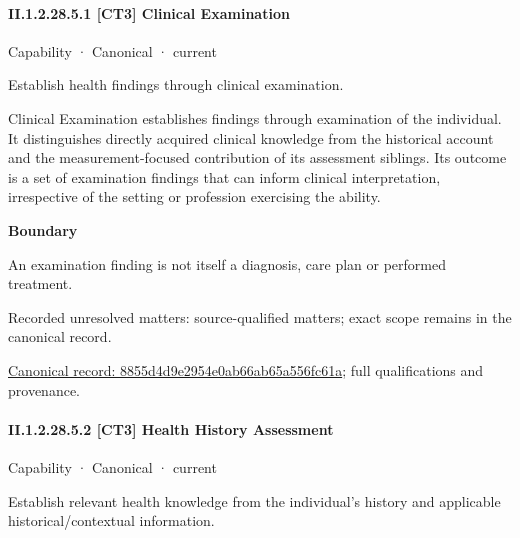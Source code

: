 \paragraph*{II.1.2.28.5.1 [CT3] Clinical Examination}
\label{navigation:II.1.2.28.5.1}

\label{element:8855d4d9e2954e0ab66ab65a556fc61a}
{\small Capability · Canonical · current}\par

Establish health findings through clinical examination.



Clinical Examination establishes findings through examination of the individual. It distinguishes directly acquired clinical knowledge from the historical account and the measurement-focused contribution of its assessment siblings. Its outcome is a set of examination findings that can inform clinical interpretation, irrespective of the setting or profession exercising the ability.



\textbf{Boundary}



An examination finding is not itself a diagnosis, care plan or performed treatment.


{\small Recorded unresolved matters: source-qualified matters; exact scope remains in the canonical record.}\par
{\footnotesize \href{../../../../continuum/strategy/capability/8855d4d9e2954e0ab66ab65a556fc61a.md}{Canonical record: 8855d4d9e2954e0ab66ab65a556fc61a}; full qualifications and provenance.}\par
\paragraph*{II.1.2.28.5.2 [CT3] Health History Assessment}
\label{navigation:II.1.2.28.5.2}

\label{element:7ea7e3f74e2940a7934b588a1a038834}
{\small Capability · Canonical · current}\par

Establish relevant health knowledge from the individual’s history and applicable historical/contextual information.



